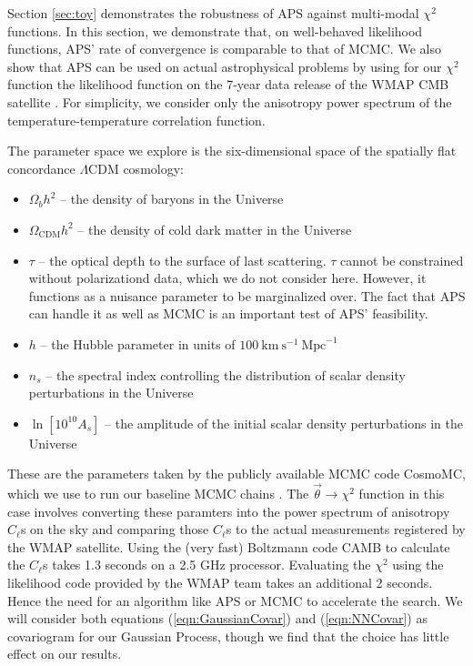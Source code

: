 \documentclass[useAMS,usenatbib]{aastex}
\begin{document}
Section \ref{sec:toy} demonstrates the robustness of APS against multi-modal
$\chi^2$ functions.  In this section, we demonstrate 
that, on well-behaved likelihood functions, APS' rate of convergence is
comparable to that of MCMC.  
We also show that APS can be used on actual astrophysical
problems by using for our $\chi^2$ function the likelihood function on the
7-year data release of the WMAP CMB satellite \cite{wmap7,wmap7likelihood}.
For simplicity, we consider only the anisotropy
power spectrum of the temperature-temperature correlation function.

The parameter space we explore is the six-dimensional space of the spatially
flat concordance $\Lambda$CDM cosmology:
\begin{itemize}
\item$\Omega_bh^2$ -- the density of baryons in the Universe
\\
\item$\Omega_\text{CDM}h^2$ -- the density of cold dark matter in the Universe
\\
\item$\tau$ -- the optical depth to the surface of last scattering.  $\tau$ cannot be
constrained without polarizationd data, which we do not consider here.  However, it functions
as a nuisance parameter to be marginalized over.  The fact that APS can handle it as well as
MCMC is an important test of APS' feasibility.
\\
\item$h$ -- the Hubble parameter in units of
$100~\text{km}~\text{s}^{-1}~\text{Mpc}^{-1}$
\\
\item$n_s$ -- the spectral index controlling the distribution of scalar density
perturbations in the Universe
\\
\item$\ln[10^{10}A_s]$ -- the amplitude of the initial scalar density
perturbations in the Universe
\end{itemize}
These are the parameters taken by the publicly available MCMC code CosmoMC,
which we use to run our baseline MCMC chains \cite{cosmomc}.  The
$\vec{\theta}\rightarrow\chi^2$ function in this case involves converting these
paramters into the power spectrum of anisotropy $C_\ell$s on the sky and
comparing those $C_\ell$s to the actual measurements registered by the WMAP
satellite.  Using the (very fast) Boltzmann code CAMB to calculate the $C_\ell$s
\cite{camb} takes 1.3 seconds on a 2.5 GHz processor.  
Evaluating the $\chi^2$ using the likelihood code provided by the WMAP team
\cite{wmap7likelihood} takes an additional 2 seconds.  Hence the need
for an algorithm like APS or MCMC to accelerate the search.
We will consider both equations (\ref{eqn:GaussianCovar}) and (\ref{eqn:NNCovar})
as covariogram for our Gaussian Process, 
though we find that the choice has little effect on our
results.
\end{document}
